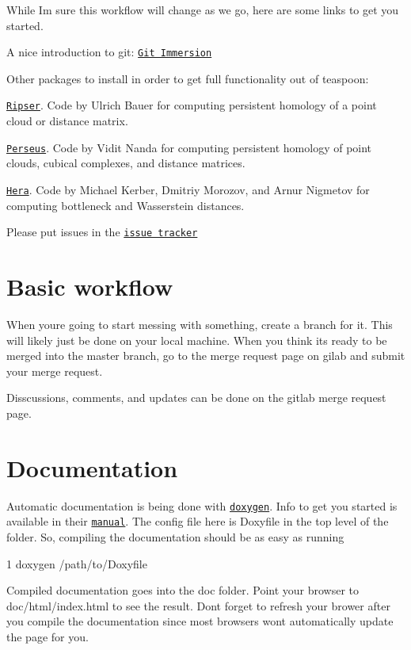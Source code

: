 While I\textquotesingle{}m sure this workflow will change as we go, here are some links to get you started.


\begin{DoxyItemize}
\item A nice introduction to git\+: \href{http://gitimmersion.com/}{\tt Git Immersion}
\item Other packages to install in order to get full functionality out of teaspoon\+:
\begin{DoxyItemize}
\item \href{https://github.com/Ripser/ripser}{\tt Ripser}. Code by Ulrich Bauer for computing persistent homology of a point cloud or distance matrix.
\item \href{http://people.maths.ox.ac.uk/nanda/perseus/index.html}{\tt Perseus}. Code by Vidit Nanda for computing persistent homology of point clouds, cubical complexes, and distance matrices.
\item \href{https://bitbucket.org/grey_narn/hera}{\tt Hera}. Code by Michael Kerber, Dmitriy Morozov, and Arnur Nigmetov for computing bottleneck and Wasserstein distances.
\end{DoxyItemize}
\item Please put issues in the \href{https://gitlab.msu.edu/TSAwithTDA/teaspoon/issues}{\tt issue tracker}
\end{DoxyItemize}

\section*{Basic workflow}

When you\textquotesingle{}re going to start messing with something, create a branch for it. This will likely just be done on your local machine. When you think it\textquotesingle{}s ready to be merged into the master branch, go to the merge request page on gilab and submit your merge request.

Disscussions, comments, and updates can be done on the gitlab merge request page.

\section*{Documentation}

Automatic documentation is being done with \href{www.doxygen.org}{\tt doxygen}. Info to get you started is available in their \href{http://www.stack.nl/~dimitri/doxygen/manual/index.html}{\tt manual}. The config file here is {\ttfamily Doxyfile} in the top level of the folder. So, compiling the documentation should be as easy as running 
\begin{DoxyCode}
1 doxygen /path/to/Doxyfile
\end{DoxyCode}
 Compiled documentation goes into the {\ttfamily doc} folder. Point your browser to {\ttfamily doc/html/index.\+html} to see the result. Don\textquotesingle{}t forget to refresh your brower after you compile the documentation since most browsers won\textquotesingle{}t automatically update the page for you.

